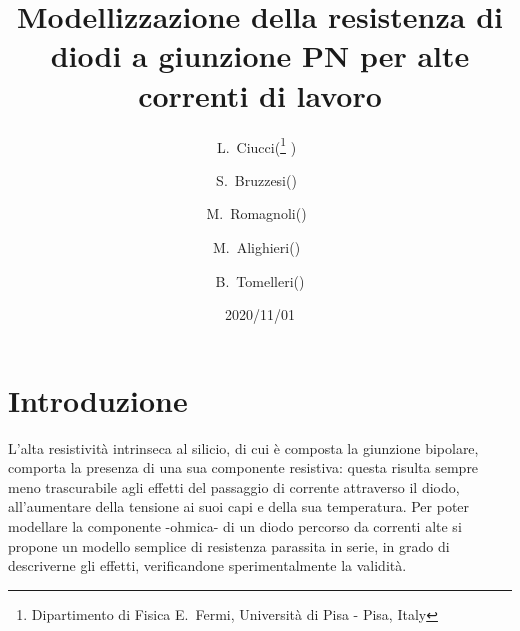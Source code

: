 \documentclass{article}[a4paper, oneside, 11pt]
\title{Modellizzazione della resistenza di diodi a giunzione PN per alte 
correnti di lavoro}
\author{L.~Ciucci(\thanks{Dipartimento di Fisica E.~Fermi, Universit\`a di Pisa 
- Pisa, Italy} )~\and S.~Bruzzesi(\protect\footnotemark[1] )~\and 
M.~Romagnoli(\protect\footnotemark[1] )~\and 
M.~Alighieri(\protect\footnotemark[1] )~\and 
B.~Tomelleri(\protect\footnotemark[1] )}
\date{2020/11/01}
\begin{document}
\maketitle



\section{Introduzione}
L'alta resistività intrinseca al silicio, di cui è composta la giunzione
bipolare, comporta la presenza di una sua componente resistiva: questa 
risulta sempre meno trascurabile agli effetti del passaggio di corrente
attraverso il diodo, all'aumentare della tensione ai suoi capi e della sua 
temperatura. Per poter modellare la componente -ohmica- di un diodo
percorso da correnti alte si propone un modello semplice di resistenza
parassita in serie, in grado di descriverne gli effetti, verificandone 
sperimentalmente la validità.


\end{document}
